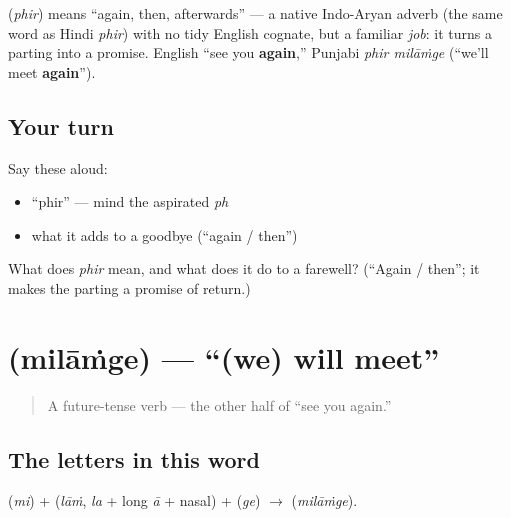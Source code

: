 \begin{cousinweb}
\textbf{} (\emph{phir}) means \textquotedblleft{}again, then, afterwards\textquotedblright{} — a native Indo-Aryan adverb (the same word as Hindi \emph{phir}) with no tidy English cognate, but a familiar \emph{job}: it turns a parting into a promise. English \textquotedblleft{}see you \textbf{again},\textquotedblright{} Punjabi \emph{phir milāṁge} (\textquotedblleft{}we'll meet \textbf{again}\textquotedblright{}).
\end{cousinweb}

\subsection*{Your turn}
Say these aloud:

\begin{itemize}
\raggedright
  \item \textquotedblleft{}phir\textquotedblright{} — mind the aspirated \emph{ph}
  \item what it adds to a goodbye (\textquotedblleft{}again / then\textquotedblright{})
\end{itemize}

\begin{tcolorbox}[breakable,colback=teal!4,colframe=teal!35!black,title={Before you move on}]
What does \emph{phir} mean, and what does it do to a farewell? (\textquotedblleft{}Again / then\textquotedblright{}; it makes the parting a promise of return.)
\end{tcolorbox}
\section[\texorpdfstring{\pa{ਮਿਲਾਂਗੇ} (milāṁge)}{ਮਿਲਾਂਗੇ (milāṁge)}]{ (milāṁge) — \textquotedblleft{}(we) will meet\textquotedblright{}}

\label{lesson:PA-C04-milaange}



\begin{quote}
A future-tense verb — the other half of \textquotedblleft{}see you again.\textquotedblright{}
\end{quote}

\subsection*{The letters in this word}
\textbf{} (\emph{mi}) + \textbf{} (\emph{lāṁ}, \emph{la} + long \emph{ā} + nasal) + \textbf{} (\emph{ge}) $\to$ \textbf{} (\emph{milāṁge}).

